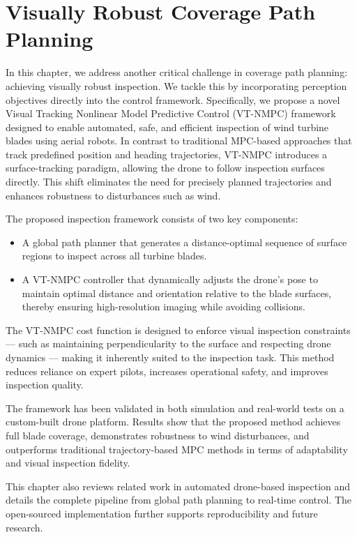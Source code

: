 \chapter{Visually Robust Coverage Path Planning}
In this chapter, we address another critical challenge in coverage path planning: achieving visually robust inspection. We tackle this by incorporating perception objectives directly into the control framework. Specifically, we propose a novel Visual Tracking Nonlinear Model Predictive Control (VT-NMPC) framework designed to enable automated, safe, and efficient inspection of wind turbine blades using aerial robots. In contrast to traditional MPC-based approaches that track predefined position and heading trajectories, VT-NMPC introduces a surface-tracking paradigm, allowing the drone to follow inspection surfaces directly. This shift eliminates the need for precisely planned trajectories and enhances robustness to disturbances such as wind.

The proposed inspection framework consists of two key components:
\begin{itemize}
    
\item A global path planner that generates a distance-optimal sequence of surface regions to inspect across all turbine blades.

\item  A VT-NMPC controller that dynamically adjusts the drone’s pose to maintain optimal distance and orientation relative to the blade surfaces, thereby ensuring high-resolution imaging while avoiding collisions.

\end{itemize}

The VT-NMPC cost function is designed to enforce visual inspection constraints — such as maintaining perpendicularity to the surface and respecting drone dynamics — making it inherently suited to the inspection task. This method reduces reliance on expert pilots, increases operational safety, and improves inspection quality.

The framework has been validated in both simulation and real-world tests on a custom-built drone platform. Results show that the proposed method achieves full blade coverage, demonstrates robustness to wind disturbances, and outperforms traditional trajectory-based MPC methods in terms of adaptability and visual inspection fidelity.

This chapter also reviews related work in automated drone-based inspection and details the complete pipeline from global path planning to real-time control. The open-sourced implementation further supports reproducibility and future research.
